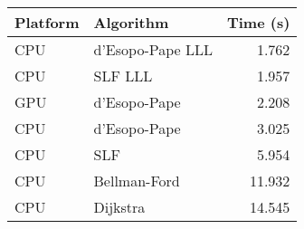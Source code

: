 \begin{tabular}{llr}
  \hline
  Platform & Algorithm & Time (s) \\
  \hline
  CPU & d'Esopo-Pape LLL & 1.762 \\
  CPU & SLF LLL & 1.957 \\
  GPU & d'Esopo-Pape & 2.208 \\
  CPU & d'Esopo-Pape & 3.025 \\
  CPU & SLF & 5.954 \\
  CPU & Bellman-Ford & 11.932 \\
  CPU & Dijkstra & 14.545 \\
  \hline
\end{tabular}
